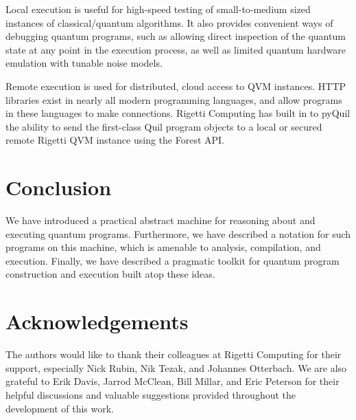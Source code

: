 \documentclass[conference]{IEEEtran}
\begin{document}
Local execution is useful for high-speed testing of small-to-medium sized instances of classical/quantum algorithms. It also provides convenient ways of debugging quantum programs, such as allowing direct inspection of the quantum state at any point in the execution process, as well as limited quantum hardware emulation with tunable noise models.

Remote execution is used for distributed, cloud access to QVM instances. HTTP libraries exist in nearly all modern programming languages, and allow programs in these languages to make connections. Rigetti Computing has built in to pyQuil the ability to send the first-class Quil program objects to a local or secured remote Rigetti QVM instance using the Forest API.

\section{Conclusion}
We have introduced a practical abstract machine for reasoning about and executing quantum programs. Furthermore, we have described a notation for such programs on this machine, which is amenable to analysis, compilation, and execution. Finally, we have described a pragmatic toolkit for quantum program construction and execution built atop these ideas.

\section{Acknowledgements}
The authors would like to thank their colleagues at Rigetti Computing for their support, especially Nick Rubin, Nik Tezak, and Johannes Otterbach. We are also grateful to Erik Davis, Jarrod McClean, Bill Millar, and Eric Peterson for their helpful discussions and valuable suggestions provided throughout the development of this work.

\appendix
\end{document}

